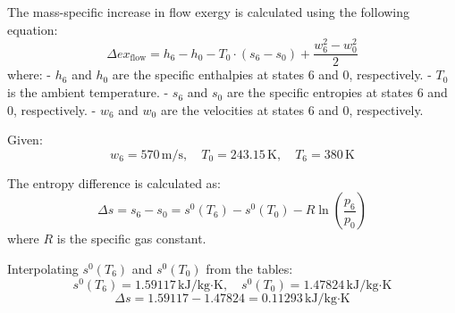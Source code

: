 The mass-specific increase in flow exergy is calculated using the following equation:  
\[
\Delta ex_{\text{flow}} = h_6 - h_0 - T_0 \cdot (s_6 - s_0) + \frac{w_6^2 - w_0^2}{2}
\]  
where:  
- \( h_6 \) and \( h_0 \) are the specific enthalpies at states 6 and 0, respectively.  
- \( T_0 \) is the ambient temperature.  
- \( s_6 \) and \( s_0 \) are the specific entropies at states 6 and 0, respectively.  
- \( w_6 \) and \( w_0 \) are the velocities at states 6 and 0, respectively.  

Given:  
\[
w_6 = 570 \, \text{m/s}, \quad T_0 = 243.15 \, \text{K}, \quad T_6 = 380 \, \text{K}
\]  

The entropy difference is calculated as:  
\[
\Delta s = s_6 - s_0 = s^0(T_6) - s^0(T_0) - R \ln \left(\frac{p_6}{p_0}\right)
\]  
where \( R \) is the specific gas constant.  

Interpolating \( s^0(T_6) \) and \( s^0(T_0) \) from the tables:  
\[
s^0(T_6) = 1.59117 \, \text{kJ/kg·K}, \quad s^0(T_0) = 1.47824 \, \text{kJ/kg·K}
\]  
\[
\Delta s = 1.59117 - 1.47824 = 0.11293 \, \text{kJ/kg·K}
\]
